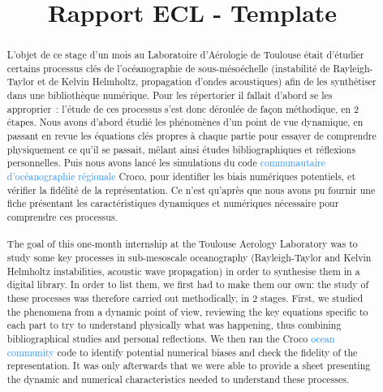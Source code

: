 \documentclass{rapportECC}
\title{Rapport ECL - Template} %
\newcommand{\FAadd}[1]{\textcolor{DodgerBlue}{{#1}}}                     %
\begin{document}





        
\fairemarges %
\fairepagedegarde %


\tabledematieres %

\onehalfspacing
\begin{abstract}
    \onehalfspacing
    L’objet de ce stage d’un mois au Laboratoire d’Aérologie de Toulouse était d’étudier certains processus clés de l’océanographie de sous-mésoéchelle (instabilité de Rayleigh-Taylor et de Kelvin Helmholtz, propagation d’ondes acoustiques) afin de les synthétiser dans une bibliothèque numérique. Pour les répertorier il fallait d’abord se les approprier : l’étude de ces processus s’est donc déroulée de façon méthodique, en 2 étapes. Nous avons d’abord étudié les phénomènes d’un point de vue dynamique, en passant en revue les équations clés propres à chaque partie pour essayer de comprendre physiquement ce qu’il se passait, mêlant ainsi études bibliographiques et réflexions personnelles. Puis nous avons lancé les simulations du code \FAadd{communautaire d'océanographie régionale} Croco, pour identifier les biais numériques potentiels, et vérifier la fidélité de la représentation. Ce n’est qu’après que nous avons pu fournir une fiche présentant les caractéristiques dynamiques et numériques nécessaire pour comprendre ces processus.
\\
\vspace{0,5 cm}
\\
The goal of this one-month internship at the Toulouse Aerology Laboratory was to study some key processes in sub-mesoscale oceanography (Rayleigh-Taylor and Kelvin Helmholtz instabilities, acoustic wave propagation) in order to synthesise them in a digital library. In order to list them, we first had to make them our own: the study of these processes was therefore carried out methodically, in 2 stages. First, we studied the phenomena from a dynamic point of view, reviewing the key equations specific to each part to try to understand physically what was happening, thus combining bibliographical studies and personal reflections. We then ran the Croco \FAadd{ocean community} code to identify potential numerical biases and check the fidelity of the representation. It was only afterwards that we were able to provide a sheet presenting the dynamic and numerical characteristics needed to understand these processes.
\end{abstract}
\newpage
\end{document}
